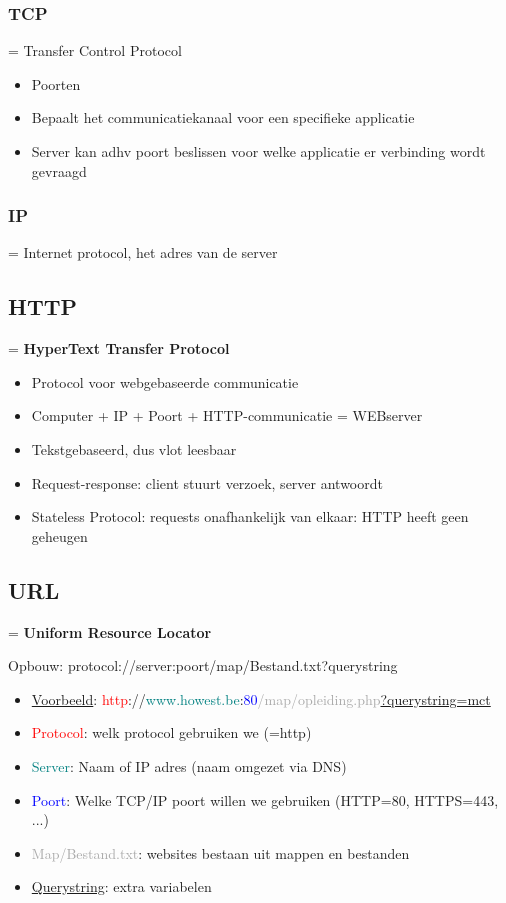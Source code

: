 \documentclass{article}
\newcommand{\bold}[1]{\textbf{#1}}
\begin{document}
\subsubsection{TCP}
= Transfer Control Protocol

\begin{itemize}
    \item Poorten
    \item Bepaalt het communicatiekanaal voor een specifieke applicatie
    \item Server kan adhv poort beslissen voor welke applicatie er verbinding wordt gevraagd
\end{itemize}


\subsubsection{IP}
= Internet protocol, het adres van de server

\subsection{HTTP}
= \bold{HyperText Transfer Protocol}
\begin{itemize}
    \item Protocol voor webgebaseerde communicatie
    \item Computer + IP + Poort + HTTP-communicatie = WEBserver
    \item Tekstgebaseerd, dus vlot leesbaar
    \item Request-response: client stuurt verzoek, server antwoordt
    \item Stateless Protocol: requests onafhankelijk van elkaar: HTTP heeft geen geheugen
\end{itemize}

\subsection{URL}
= \bold{Uniform Resource Locator}

Opbouw: protocol://server:poort/map/Bestand.txt?querystring
\begin{itemize}
    \item \underline{Voorbeeld}: \textcolor{red}{http}://\textcolor{teal}{www.howest.be}:\textcolor{blue}{80}\textcolor{darkgray}{/map/opleiding.php}\underline{?querystring=mct}
    \item \textcolor{red}{Protocol}: welk protocol gebruiken we (=http)
    \item \textcolor{teal}{Server}: Naam of IP adres (naam omgezet via DNS)
    \item \textcolor{blue}{Poort}: Welke TCP/IP poort willen we gebruiken (HTTP=80, HTTPS=443, ...)
    \item \textcolor{darkgray}{Map/Bestand.txt}: websites bestaan uit mappen en bestanden
    \item \underline{Querystring}: extra variabelen
\end{itemize}
\end{document}
